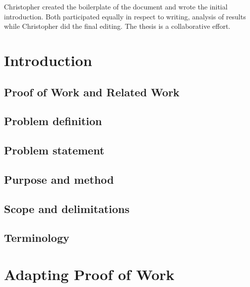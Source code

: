 \documentclass[a4paper,11pt]{kth-mag}
\begin{document}
Christopher created the boilerplate of the document and wrote the initial introduction.
Both participated equally in respect to writing, analysis of results while Christopher did the final editing. The thesis is a collaborative effort.


\newpage  
\setcounter{section}{0}
\tableofcontents
\newpage
\mainmatter

 
\section{Introduction}

\subsection*{Proof of Work and Related Work}

\subsection*{Problem definition}

\subsection*{Problem statement} %

\subsection*{Purpose and method}

\subsection*{Scope and delimitations}

%
\subsection*{Terminology}


\section{Adapting Proof of Work}

\end{document}

